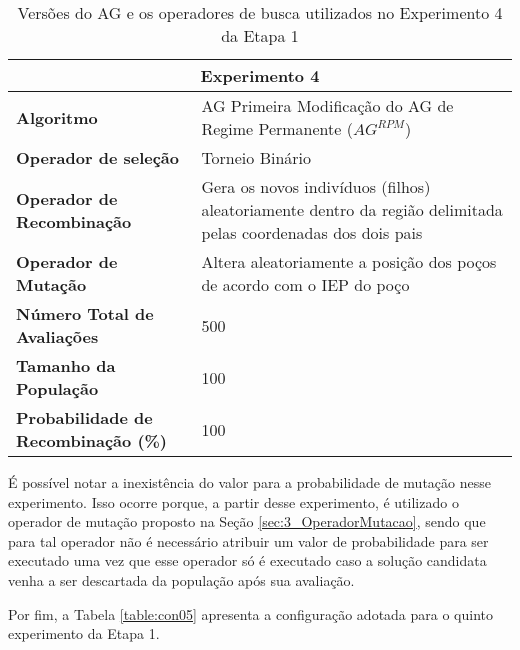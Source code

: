 \begin{table}[!htbp]
\centering
\caption{Versões do AG e os operadores de busca utilizados no Experimento 4 da Etapa 1}
\label{table:con04}
\begin{tabular}{|p{6cm}|p{9cm}|}
\hline
 
 \multicolumn{2}{|c|}{\textbf{Experimento 4}} \\ \hline
\textbf{Algoritmo} & AG Primeira Modificação do AG de Regime Permanente ($AG^{RPM}$) \\ \hline
\textbf{Operador de seleção} & Torneio Binário \\ \hline
\textbf{Operador de Recombinação} & Gera os novos indivíduos (filhos) aleatoriamente dentro da região delimitada pelas coordenadas dos dois pais \\  \hline
\textbf{Operador de Mutação} & Altera aleatoriamente a posição dos poços de acordo com o IEP do poço \\ \hline
\textbf{Número Total de Avaliações} & 500 \\ \hline
\textbf{Tamanho da População} & 100 \\ \hline
\textbf{Probabilidade de Recombinação (\%)} & 100 \\ \hline
\end{tabular}
\end{table}

É possível notar a inexistência do valor para a probabilidade de mutação nesse experimento. Isso ocorre porque, a partir desse experimento, é utilizado o operador de mutação proposto na Seção \ref{sec:3_OperadorMutacao}, sendo que para tal operador não é necessário atribuir um valor de probabilidade para ser executado uma vez que esse operador só é executado caso a solução candidata venha a ser descartada da população após sua avaliação.

Por fim, a Tabela \ref{table:con05} apresenta a configuração adotada para o quinto experimento da Etapa 1. 

